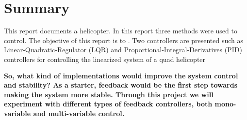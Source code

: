 \section*{Summary}
This report documents a helicopter. In this report three methods were used to control. The objective of this report is to . Two controllers are presented such as Linear-Quadratic-Regulator ({LQR}) and Proportional-Integral-Derivatives ({PID}) controllers for controlling the linearized system of a quad helicopter



\textbf{
So, what kind of implementations would improve the system control and stability? As a starter, feedback would be the first step towards making the system more stable. Through this project we will experiment with different types of feedback controllers, both mono-variable and multi-variable control.}